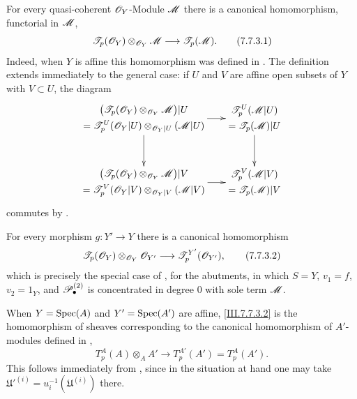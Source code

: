 \begin{env}[7.7.3]
\label{III.7.7.3}
For every quasi-coherent $\mathscr{O}_Y$-Module $\mathscr{M}$ there is
a canonical homomorphism, functorial in $\mathscr{M}$,
\[
  \sh{T}_p(\sh{O}_Y)
  \otimes_{\sh{O}_Y}\sh{M}
  \longrightarrow
  \sh{T}_p(\sh{M}).
  \tag{7.7.3.1}\label{III.7.7.3.1}
\]
Indeed, when $Y$ is affine this homomorphism was defined in
.  The definition extends immediately to
the general case: if $U$ and $V$ are affine open subsets of
$Y$ with $V\subset U$, the diagram
\[
\xymatrix@C=18pt@R=32pt{
  {\begin{gathered}
    \bigl(\sh{T}_p(\sh{O}_Y)
      \otimes_{\sh{O}_Y}\sh{M}\bigr)|U\\
    =
    \sh{T}^U_p(\sh{O}_Y|U)
      \otimes_{\sh{O}_Y|U}(\sh{M}|U)
  \end{gathered}}
  \ar[r]\ar[d]
  &
  {\begin{gathered}
    \sh{T}^U_p(\sh{M}|U)\\
    =\sh{T}_p(\sh{M})|U
  \end{gathered}}
  \ar[d]
  \\
  {\begin{gathered}
    \bigl(\sh{T}_p(\sh{O}_Y)
      \otimes_{\sh{O}_Y}\sh{M}\bigr)|V\\
    =
    \sh{T}^V_p(\sh{O}_Y|V)
      \otimes_{\sh{O}_Y|V}(\sh{M}|V)
  \end{gathered}}
  \ar[r]
  &
  {\begin{gathered}
    \sh{T}^V_p(\sh{M}|V)\\
    =\sh{T}_p(\sh{M})|V
  \end{gathered}}
}
\]
commutes by .

For every morphism $g:Y'\to Y$ there is a canonical
homomorphism
\[
  \sh{T}_p(\sh{O}_Y)
  \otimes_{\sh{O}_Y}\sh{O}_{Y'}
  \longrightarrow
  \sh{T}^{Y'}_p(\sh{O}_{Y'}),
  \tag{7.7.3.2}\label{III.7.7.3.2}
\]
which is precisely the special case of
, for the abutments, in which
$S=Y$, $v_1=f$, $v_2=1_Y$, and
$\mathscr{P}^{(2)}_\bullet$ is concentrated in degree $0$ with
sole term $\mathscr{M}$.

When $Y=\operatorname{Spec}(A)$ and $Y'=\operatorname{Spec}(A')$ are affine,
\eqref{III.7.7.3.2} is the homomorphism of sheaves
corresponding to the canonical homomorphism of $A'$-modules
defined in ,
\[
  T^A_p(A)\otimes_A A'
  \longrightarrow
  T^{A'}_p(A')
  =
  T^A_p(A').
\]
This follows immediately from , since in
the situation at hand one may take
$\mathfrak U'^{(i)}=u_i^{-1}(\mathfrak U^{(i)})$ there.
\end{env}

